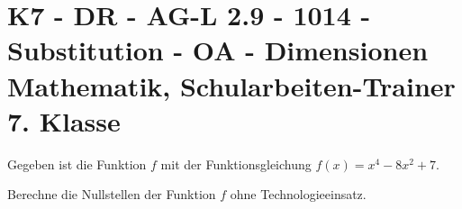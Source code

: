 \section{K7 - DR - AG-L 2.9 - 1014 - Substitution - OA - Dimensionen Mathematik, Schularbeiten-Trainer 7. Klasse}

\begin{beispiel}[K7 - DR]{1} %
Gegeben ist die Funktion $f$ mit der Funktionsgleichung $f(x)=x^4-8x^2+7$.

Berechne die Nullstellen der Funktion $f$ ohne Technologieeinsatz.\leer

				
				\end{beispiel}